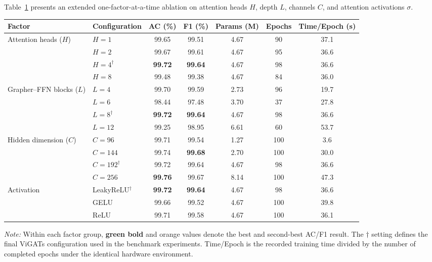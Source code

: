 \documentclass[]{interact}
\theoremstyle{plain}
\theoremstyle{definition}
\theoremstyle{remark}
\newcommand{\bestresult}[1]{\textcolor{bestgreen}{\textbf{#1}}}
\newcommand{\secondresult}[1]{\textcolor{secondorange}{#1}}
\begin{document}
Table~\ref{tab:ablation_ext} presents an extended one-factor-at-a-time ablation on attention heads $H$, depth $L$, channels $C$, and attention activations $\sigma$.

\begin{table}[H]
\footnotesize
\setlength{\tabcolsep}{4pt}
{\begin{tabular}{llccccc} \toprule
\textbf{Factor} & \textbf{Configuration} & \textbf{AC (\%)} & \textbf{F1 (\%)} & \textbf{Params (M)} & \textbf{Epochs} & \textbf{Time/Epoch (s)} \\ \midrule
\multirow{4}{*}{Attention heads ($H$)} & $H=1$ & 99.65 & 99.51 & 4.67 & 90 & 37.1 \\
 & $H=2$ & \secondresult{99.67} & \secondresult{99.61} & 4.67 & 95 & 36.6 \\
 & $H=4^{\dagger}$ & \bestresult{99.72} & \bestresult{99.64} & 4.67 & 98 & 36.6 \\
 & $H=8$ & 99.48 & 99.38 & 4.67 & 84 & 36.0 \\
\midrule
\multirow{4}{*}{Grapher--FFN blocks ($L$)} & $L=4$ & \secondresult{99.70} & \secondresult{99.59} & 2.73 & 96 & 19.7 \\
 & $L=6$ & 98.44 & 97.48 & 3.70 & 37 & 27.8 \\
 & $L=8^{\dagger}$ & \bestresult{99.72} & \bestresult{99.64} & 4.67 & 98 & 36.6 \\
 & $L=12$ & 99.25 & 98.95 & 6.61 & 60 & 53.7 \\
\midrule
\multirow{4}{*}{Hidden dimension ($C$)} & $C=96$ & 99.71 & 99.54 & 1.27 & 100 & 3.6 \\
 & $C=144$ & \secondresult{99.74} & \bestresult{99.68} & 2.70 & 100 & 30.0 \\
 & $C=192^{\dagger}$ & 99.72 & 99.64 & 4.67 & 98 & 36.6 \\
 & $C=256$ & \bestresult{99.76} & \secondresult{99.67} & 8.14 & 100 & 47.3 \\
\midrule
\multirow{3}{*}{Activation} & LeakyReLU$^{\dagger}$ & \bestresult{99.72} & \bestresult{99.64} & 4.67 & 98 & 36.6 \\
 & GELU & 99.66 & 99.52 & 4.67 & 100 & 39.8 \\
 & ReLU & \secondresult{99.71} & \secondresult{99.58} & 4.67 & 100 & 36.1 \\
\bottomrule
\end{tabular}}
\label{tab:ablation_ext}
\parbox{\textwidth}{\vspace{2pt}\footnotesize\textit{Note:} Within each factor group, \bestresult{green bold} and \secondresult{orange} values denote the best and second-best AC/F1 result. The $\dagger$ setting defines the final ViGATs configuration used in the benchmark experiments. Time/Epoch is the recorded training time divided by the number of completed epochs under the identical hardware environment.}
\end{table}
\end{document}
